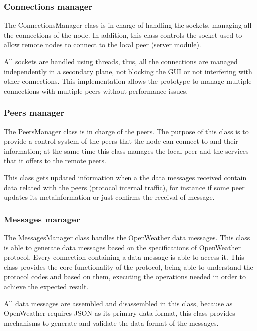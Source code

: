 \subsubsection{Connections manager}

The ConnectionsManager class is in charge of handling the sockets, managing all the connections of the node. 
In addition, this class controls the socket used to allow remote nodes to connect to the local peer (server module).

All sockets are handled using threads, thus, all the connections are managed independently in a secondary plane, not blocking the \gls{GUI} or not interfering with other connections. This implementation allows the prototype to manage multiple connections with multiple peers without performance issues.

\subsubsection{Peers manager}

The PeersManager class is in charge of the peers. The purpose of this class is to provide a control system of the peers that the node can connect to and their information; at the same time this class manages the local peer and the services that it offers to the remote peers.

This class gets updated information when a the data messages received contain data related with the peers (protocol internal traffic), for instance if some peer updates its metainformation or just confirms the receival of message.

\subsubsection{Messages manager}

The MessagesManager class handles the OpenWeather data messages. This class is able to generate data messages based on the specifications of OpenWeather protocol. Every connection containing a data message is able to access it. This class provides the core functionality of the protocol, being able to understand the protocol codes and based on them, executing the operations needed in order to achieve the expected result.

All data messages are assembled and disassembled in this class, because as OpenWeather requires  \gls{JSON} as its primary data format, this class provides mechanisms to generate and validate the data format of the messages.

